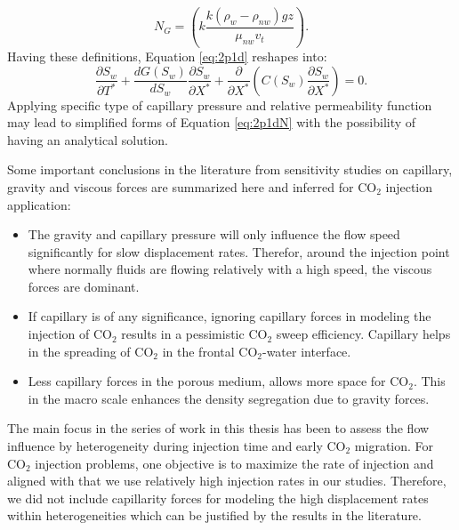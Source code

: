  \begin{equation}
  N_G=(k\frac{k(\rho_w-\rho_{nw})gz}{\mu_{nw}v_t}).
  \label{eq:Fn}
 \end{equation} Having these definitions, Equation \ref{eq:2p1d} reshapes into:
 \begin{equation}
  \frac{\partial S_w}{\partial T^*}+\frac{dG(S_w)}{dS_w}\frac{\partial
S_w}{\partial X^*}+\frac{\partial}{\partial X^*}\left( C(S_w)\frac{\partial
S_w}{\partial X^*}\right)=0.
  \label{eq:2p1dN}
 \end{equation} Applying specific type of capillary pressure and relative
permeability function may lead to simplified forms of Equation \ref{eq:2p1dN}
with the possibility of having an analytical
solution\cite{yortsos1983analytical}. 

Some important conclusions in the literature from sensitivity studies on
capillary, gravity and viscous forces are summarized here and inferred for
$\mbox{CO}_2$ injection application:

\begin{itemize}
 \item The gravity and capillary pressure will only influence the flow speed
significantly for slow displacement rates. Therefor, around the injection point
where normally fluids are flowing relatively with a high speed, the viscous
forces
are dominant.
 
 \item If capillary is of any significance, ignoring capillary forces in
modeling the injection of $\mbox{CO}_2$ results in a pessimistic $\mbox{CO}_2$
sweep efficiency. Capillary helps in the spreading of $\mbox{CO}_2$ in the
frontal $\mbox{CO}_2$-water interface.
 
 \item Less capillary forces in the porous medium, allows more space for
$\mbox{CO}_2$. This in the macro scale enhances the density segregation due to
gravity forces.
\end{itemize}

The main focus in the series of work in this thesis has been to assess the flow
influence by heterogeneity during injection time and early $\mbox{CO}_2$
migration. For $\mbox{CO}_2$ injection problems, one objective is to maximize
the rate of injection and aligned with that we use relatively high injection
rates in our studies. Therefore, we did not include capillarity forces for
modeling the high displacement rates within heterogeneities which can be
justified by the results in the literature.


